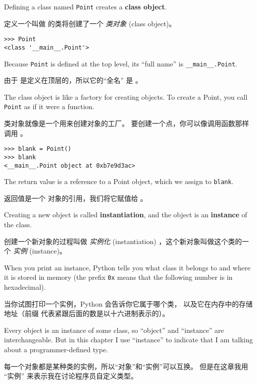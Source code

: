 Defining a class named {\tt Point} creates a {\bf class object}.

定义一个叫做  的类将创建了一个 {\em 类对象} (class object)。

\begin{lstlisting}
>>> Point
<class '__main__.Point'>
\end{lstlisting}
%
Because {\tt Point} is defined at the top level, its ``full
name'' is \verb"__main__.Point".

由于  是定义在顶层的，所以它的``全名'' 是  。

  

The class object is like a factory for creating objects.  To create a
Point, you call {\tt Point} as if it were a function.

类对象就像是一个用来创建对象的工厂。
要创建一个点，你可以像调用函数那样调用  。

\begin{lstlisting}
>>> blank = Point()
>>> blank
<__main__.Point object at 0xb7e9d3ac>
\end{lstlisting}
%
The return value is a reference to a Point object, which we
assign to {\tt blank}.

返回值是一个  对象的引用，我们将它赋值给  。

Creating a new object is called
{\bf instantiation}, and the object is an {\bf instance} of
the class.

创建一个新对象的过程叫做 {\em 实例化} (instantiation) ，这个新对象叫做这个类的一个 {\em 实例} (instance)。

  

When you print an instance, Python tells you what class it
belongs to and where it is stored in memory (the prefix
{\tt 0x} means that the following number is in hexadecimal).

当你试图打印一个实例，Python 会告诉你它属于哪个类，
以及它在内存中的存储地址（前缀  代表紧跟后面的数是以十六进制表示的）。


Every object is an instance of some class, so ``object'' and
``instance'' are interchangeable.  But in this chapter I use
``instance'' to indicate that I am talking about a programmer-defined
type.

每一个对象都是某种类的实例，所以``对象''和``实例''可以互换。  但是在这章我用 ``实例'' 来表示我在讨论程序员自定义类型。



